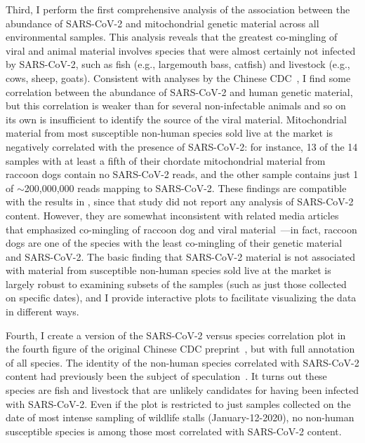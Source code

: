 \documentclass[9pt,twocolumn,twoside]{gsajnl_modified}
\begin{document}
Third, I perform the first comprehensive analysis of the association between the abundance of SARS-CoV-2 and mitochondrial genetic material across all environmental samples.
This analysis reveals that the greatest co-mingling of viral and animal material involves species that were almost certainly not infected by SARS-CoV-2, such as fish (e.g., largemouth bass, catfish) and livestock (e.g., cows, sheep, goats).
Consistent with analyses by the Chinese CDC~\citep{liu2022surveillance}, I find some correlation between the abundance of SARS-CoV-2 and human genetic material, but this correlation is weaker than for several non-infectable animals and so on its own is insufficient to identify the source of the viral material.
Mitochondrial material from most susceptible non-human species sold live at the market is negatively correlated with the presence of SARS-CoV-2: for instance, 13 of the 14 samples with at least a fifth of their chordate mitochondrial material from raccoon dogs contain no SARS-CoV-2 reads, and the other sample contains just 1 of $\sim$200,000,000 reads mapping to SARS-CoV-2.
These findings are compatible with the results in \citet{crits2023genetic}, since that study did not report any analysis of SARS-CoV-2 content.
However, they are somewhat inconsistent with related media articles that emphasized co-mingling of raccoon dog and viral material~\citep{wu2023atlantic,mueller2023nytimes}---in fact, raccoon dogs are one of the species with the least co-mingling of their genetic material and SARS-CoV-2.
The basic finding that SARS-CoV-2 material is not associated with material from susceptible non-human species sold live at the market is largely robust to examining subsets of the samples (such as just those collected on specific dates), and I provide interactive plots to facilitate visualizing the data in different ways.

Fourth, I create a version of the SARS-CoV-2 versus species correlation plot in the fourth figure of the original Chinese CDC preprint~\citep{liu2022surveillance}, but with full annotation of all species.
The identity of the non-human species correlated with SARS-CoV-2 content had previously been the subject of speculation~\citep{cohen2022anywhere, cohen2022studies, cohen2023unearthed}.
It turns out these species are fish and livestock that are unlikely candidates for having been infected with SARS-CoV-2.
Even if the plot is restricted to just samples collected on the date of most intense sampling of wildlife stalls (January-12-2020), no non-human susceptible species is among those most correlated with SARS-CoV-2 content. 
\end{document}
